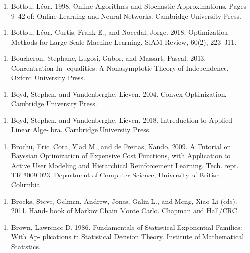 \begin{enumerate}
\item Bottou, Léon. 1998. Online Algorithms and Stochastic Approximations. Pages 9–42 of: Online Learning and Neural Networks. Cambridge University Press.
\end{enumerate}

\begin{enumerate}
\item Bottou, Léon, Curtis, Frank E., and Nocedal, Jorge. 2018. Optimization Methods for Large-Scale Machine Learning. SIAM Review, 60(2), 223–311.
\end{enumerate}

\begin{enumerate}
\item Boucheron, Stephane, Lugosi, Gabor, and Massart, Pascal. 2013. Concentration In- equalities: A Nonasymptotic Theory of Independence. Oxford University Press.
\end{enumerate}

\begin{enumerate}
\item Boyd, Stephen, and Vandenberghe, Lieven. 2004. Convex Optimization. Cambridge University Press.
\end{enumerate}

\begin{enumerate}
\item Boyd, Stephen, and Vandenberghe, Lieven. 2018. Introduction to Applied Linear Alge- bra. Cambridge University Press.
\end{enumerate}

\begin{enumerate}
\item Brochu, Eric, Cora, Vlad M., and de Freitas, Nando. 2009. A Tutorial on Bayesian Optimization of Expensive Cost Functions, with Application to Active User Modeling and Hierarchical Reinforcement Learning. Tech. rept. TR-2009-023. Department of Computer Science, University of British Columbia.
\end{enumerate}

\begin{enumerate}
\item Brooks, Steve, Gelman, Andrew, Jones, Galin L., and Meng, Xiao-Li (eds). 2011. Hand- book of Markov Chain Monte Carlo. Chapman and Hall/CRC.
\end{enumerate}

\begin{enumerate}
\item Brown, Lawrence D. 1986. Fundamentals of Statistical Exponential Families: With Ap- plications in Statistical Decision Theory. Institute of Mathematical Statistics.
\end{enumerate}

